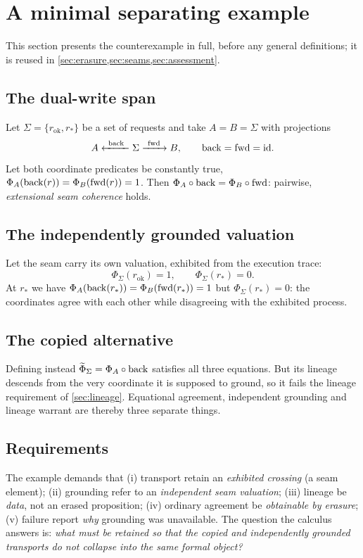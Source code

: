 \section{A minimal separating example}\label{sec:example}

This section presents the counterexample in full, before any general definitions; it is reused in \cref{sec:erasure,sec:seams,sec:assessment}.

\subsection{The dual-write span}
Let $\Sigma = \{r_{\mathrm{ok}}, r_*\}$ be a set of requests and take $A = B = \Sigma$ with projections
\[
A \xleftarrow{\ \mathrm{back}\ } \Sigma \xrightarrow{\ \mathrm{fwd}\ } B, \qquad \mathrm{back} = \mathrm{fwd} = \mathrm{id}.
\]
Let both coordinate predicates be constantly true, $\Phi_A(\mathrm{back}(r)) = \Phi_B(\mathrm{fwd}(r)) = 1$. Then $\Phi_A \circ \mathrm{back} = \Phi_B \circ \mathrm{fwd}$: pairwise, \emph{extensional seam coherence} holds.

\subsection{The independently grounded valuation}
Let the seam carry its own valuation, exhibited from the execution trace:
\[
\Phi_\Sigma(r_{\mathrm{ok}}) = 1, \qquad \Phi_\Sigma(r_*) = 0.
\]
At $r_*$ we have $\Phi_A(\mathrm{back}(r_*)) = \Phi_B(\mathrm{fwd}(r_*)) = 1$ but $\Phi_\Sigma(r_*) = 0$: the coordinates agree with each other while disagreeing with the exhibited process.

\subsection{The copied alternative}
Defining instead $\widetilde{\Phi}_\Sigma = \Phi_A \circ \mathrm{back}$ satisfies all three equations. But its lineage descends from the very coordinate it is supposed to ground, so it fails the lineage requirement of \cref{sec:lineage}. Equational agreement, independent grounding and lineage warrant are thereby three separate things.

\subsection{Requirements}
The example demands that
(i) transport retain an \emph{exhibited crossing} (a seam element);
(ii) grounding refer to an \emph{independent seam valuation};
(iii) lineage be \emph{data}, not an erased proposition;
(iv) ordinary agreement be \emph{obtainable by erasure};
(v) failure report \emph{why} grounding was unavailable.
The question the calculus answers is: \emph{what must be retained so that the copied and independently grounded transports do not collapse into the same formal object?}
